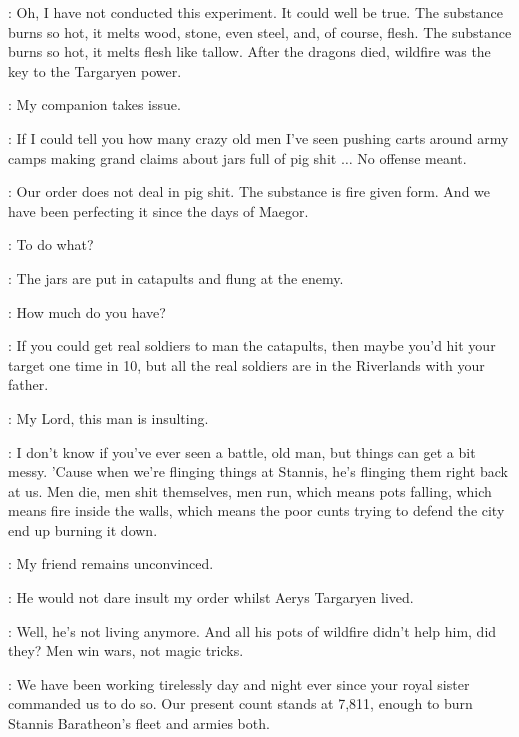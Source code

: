 \HALLYN: Oh, I have not conducted this experiment. It could well be true. The substance burns so hot, it melts wood, stone, even steel, and, of course, flesh. The substance burns so hot, it melts flesh like tallow. After the dragons died, wildfire was the key to the Targaryen power. 


\TYRION: My companion takes issue. 

\BRONN: If I could tell you how many crazy old men I've seen pushing carts around army camps making grand claims about jars full of pig shit $\ldots$ No offense meant. 

\HALLYN: Our order does not deal in pig shit. The substance is fire given form. And we have been perfecting it since the days of Maegor. 

\BRONN: To do what? 

\HALLYN: The jars are put in catapults and flung at the enemy. 

\TYRION: How much do you have? 


\BRONN: If you could get real soldiers to man the catapults, then maybe you'd hit your target one time in 10, but all the real soldiers are in the Riverlands with your father. 

\HALLYN: My Lord, this man is insulting. 


\BRONN: I don't know if you've ever seen a battle, old man, but things can get a bit messy. 'Cause when we're flinging things at Stannis, he's flinging them right back at us. Men die, men shit themselves, men run, which means pots falling, which means fire inside the walls, which means the poor cunts trying to defend the city end up burning it down. 

\TYRION: My friend remains unconvinced. 

\HALLYN: He would not dare insult my order whilst Aerys Targaryen lived. 

\BRONN: Well, he's not living anymore. And all his pots of wildfire didn't help him, did they? Men win wars, not magic tricks. 


\HALLYN: We have been working tirelessly day and night ever since your royal sister commanded us to do so. Our present count stands at 7,811, enough to burn Stannis Baratheon's fleet and armies both. 

